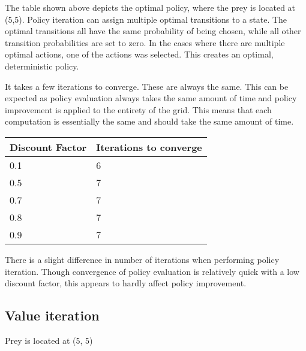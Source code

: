 \documentclass{article}
\begin{document}
The table shown above depicts the optimal policy, where the prey is located at (5,5). Policy iteration can assign multiple optimal transitions to a state. The optimal transitions all have the same probability of being chosen, while all other transition probabilities are set to zero. In the cases where there are multiple optimal actions, one of the actions was selected. This creates an optimal, deterministic policy.


It takes a few iterations to converge. These are always the same. This can be expected as policy evaluation always takes the same amount of time and policy improvement is applied to the entirety of the grid. This means that each computation is essentially the same and should take the same amount of time.




\begin{center}
	\begin{tabular}{ l || l }
		Discount Factor & Iterations to converge \\ 
		\hline
		0.1 & 6 \\
		0.5 & 7 \\
		0.7 & 7 \\
		0.8 & 7 \\	
		0.9 & 7 \\
	\end{tabular}
\end{center}
There is a slight difference in number of iterations when performing policy iteration. Though convergence of policy evaluation is relatively quick with a low discount factor, this appears to hardly affect policy improvement.

\subsection*{Value iteration}


Prey is located at (5, 5)
\end{document}
